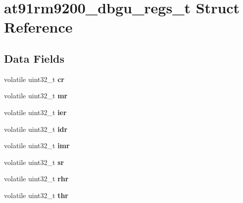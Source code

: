\hypertarget{structat91rm9200__dbgu__regs__t}{}\section{at91rm9200\+\_\+dbgu\+\_\+regs\+\_\+t Struct Reference}
\label{structat91rm9200__dbgu__regs__t}
\subsection*{Data Fields}
\begin{DoxyCompactItemize}
\item 
\mbox{\label{structat91rm9200__dbgu__regs__t_a8bf544ad3e9663a726e7e76bd4b5bf1f}} 
volatile uint32\+\_\+t {\bfseries cr}
\item 
\mbox{\label{structat91rm9200__dbgu__regs__t_a6892751cd1c671e50739fbb47128e167}} 
volatile uint32\+\_\+t {\bfseries mr}
\item 
\mbox{\label{structat91rm9200__dbgu__regs__t_a70b93e589b0934eacbc406b5539d8746}} 
volatile uint32\+\_\+t {\bfseries ier}
\item 
\mbox{\label{structat91rm9200__dbgu__regs__t_a6b5144755b2df659eb64b8afacb40905}} 
volatile uint32\+\_\+t {\bfseries idr}
\item 
\mbox{\label{structat91rm9200__dbgu__regs__t_a7a71a37d9eed98dffd239687f470901b}} 
volatile uint32\+\_\+t {\bfseries imr}
\item 
\mbox{\label{structat91rm9200__dbgu__regs__t_a95ed9ae12b166fb6b612bdedeec8de3f}} 
volatile uint32\+\_\+t {\bfseries sr}
\item 
\mbox{\label{structat91rm9200__dbgu__regs__t_a99650caa44698715e45c793aa62a85e9}} 
volatile uint32\+\_\+t {\bfseries rhr}
\item 
\mbox{\label{structat91rm9200__dbgu__regs__t_a163614de62a4f4fcb50aef34975ad747}} 
volatile uint32\+\_\+t {\bfseries thr}
\item 

\end{DoxyCompactItemize}
